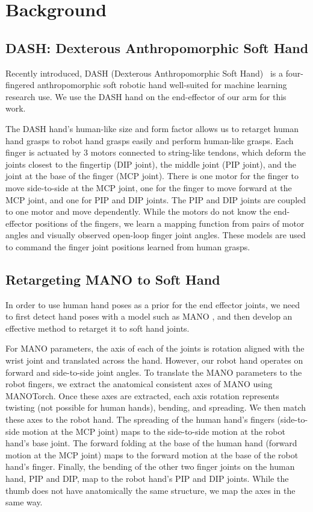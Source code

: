\chapter{Background}
\label{sec:background}

\section{DASH: Dexterous Anthropomorphic Soft Hand}

Recently introduced, DASH (Dexterous Anthropomorphic Soft Hand)~\citep{mannam2023framework} is a four-fingered anthropomorphic soft robotic hand well-suited for machine learning research use.  We use the DASH hand on the end-effector of our arm for this work. 

The DASH hand's human-like size and form factor allows us to retarget human hand grasps to robot hand grasps easily and perform human-like grasps.  Each finger is actuated by 3 motors connected to string-like tendons, which deform the joints closest to the fingertip (DIP joint), the middle joint (PIP joint), and the joint at the base of the finger (MCP joint).  There is one motor for the finger to move side-to-side at the MCP joint, one for the finger to move forward at the MCP joint, and one for PIP and DIP joints.  The PIP and DIP joints are coupled to one motor and move dependently.  While the motors do not know the end-effector positions of the fingers, we learn a mapping function from pairs of motor angles and visually observed open-loop finger joint angles. These models are used to command the finger joint positions learned from human grasps.  

\section{Retargeting MANO to Soft Hand}

In order to use human hand poses as a prior for the end effector joints, we need to first detect hand poses with a model such as MANO \cite{MANO:SIGGRAPHASIA:2017}, and then develop an effective method to retarget it to soft hand joints.

For MANO parameters, the axis of each of the joints is rotation aligned with the wrist joint and translated across the hand.  However, our robot hand operates on forward and side-to-side joint angles.  To translate the MANO parameters to the robot fingers, we extract the anatomical consistent axes of MANO using MANOTorch. Once these axes are extracted, each axis rotation represents twisting (not possible for human hands), bending, and spreading.  We then match these axes to the robot hand.  The spreading of the human hand's fingers (side-to-side motion at the MCP joint) maps to the side-to-side motion at the robot hand's base joint.  The forward folding at the base of the human hand (forward motion at the MCP joint) maps to the forward motion at the base of the robot hand's finger.  Finally, the bending of the other two finger joints on the human hand, PIP and DIP, map to the robot hand's PIP and DIP joints.  While the thumb does not have anatomically the same structure, we map the axes in the same way. 

